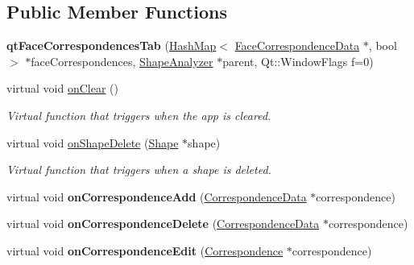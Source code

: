\subsection*{Public Member Functions}
\begin{DoxyCompactItemize}
\item 
\hypertarget{classqt_face_correspondences_tab_a6d8f996f30a0cbd5de5f159e00438f70}{}{\bfseries qt\+Face\+Correspondences\+Tab} (\hyperlink{class_hash_map}{Hash\+Map}$<$ \hyperlink{class_face_correspondence_data}{Face\+Correspondence\+Data} $\ast$, bool $>$ $\ast$face\+Correspondences, \hyperlink{class_shape_analyzer}{Shape\+Analyzer} $\ast$parent, Qt\+::\+Window\+Flags f=0)\label{classqt_face_correspondences_tab_a6d8f996f30a0cbd5de5f159e00438f70}

\item 
virtual void \hyperlink{classqt_face_correspondences_tab_a96fe4ebb18a3969b3576dddfffcaf044}{on\+Clear} ()
\begin{DoxyCompactList}\small\item\em Virtual function that triggers when the app is cleared. \end{DoxyCompactList}\item 
virtual void \hyperlink{classqt_face_correspondences_tab_a6e921225a7049a72fe4b24c355892160}{on\+Shape\+Delete} (\hyperlink{class_shape}{Shape} $\ast$shape)
\begin{DoxyCompactList}\small\item\em Virtual function that triggers when a shape is deleted. \end{DoxyCompactList}\item 
\hypertarget{classqt_face_correspondences_tab_ac82e5ba6753e031622ef9441a77a21f1}{}virtual void {\bfseries on\+Correspondence\+Add} (\hyperlink{class_correspondence_data}{Correspondence\+Data} $\ast$correspondence)\label{classqt_face_correspondences_tab_ac82e5ba6753e031622ef9441a77a21f1}

\item 
\hypertarget{classqt_face_correspondences_tab_a6baeb2cd594a9cab17964279b09e4184}{}virtual void {\bfseries on\+Correspondence\+Delete} (\hyperlink{class_correspondence_data}{Correspondence\+Data} $\ast$correspondence)\label{classqt_face_correspondences_tab_a6baeb2cd594a9cab17964279b09e4184}

\item 
\hypertarget{classqt_face_correspondences_tab_a97ea9fe1a2a34f3c8d93e07feb5e244f}{}virtual void {\bfseries on\+Correspondence\+Edit} (\hyperlink{class_correspondence}{Correspondence} $\ast$correspondence)\label{classqt_face_correspondences_tab_a97ea9fe1a2a34f3c8d93e07feb5e244f}


\end{DoxyCompactItemize}

